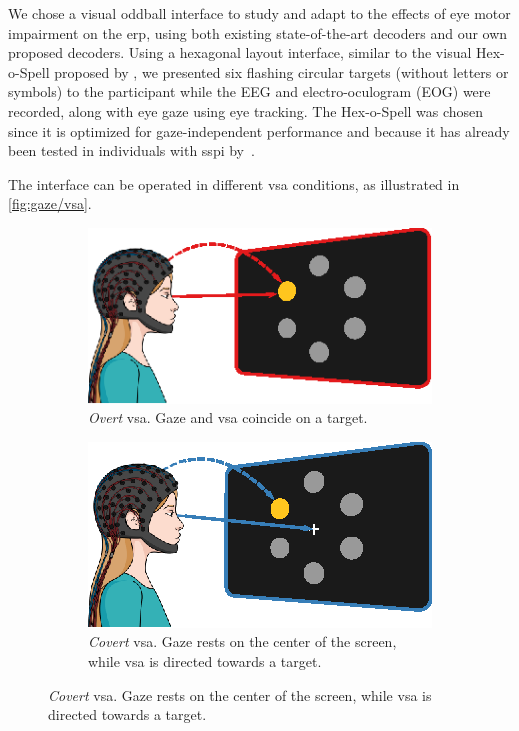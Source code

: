 We chose a visual oddball interface to study and adapt
to the effects of eye motor impairment on the \ac{erp}, using both existing state-of-the-art
decoders and our own proposed decoders.
Using a hexagonal layout interface, similar to the visual Hex-o-Spell proposed by
\textcite{Treder2010}, we presented six flashing circular targets
(without letters or symbols) to the participant while the EEG and
electro-oculogram (EOG) were recorded, along with eye gaze using eye tracking.
The Hex-o-Spell was chosen since it is optimized for gaze-independent
performance and because it has already been tested in individuals with
\ac{sspi} by~\textcite{Severens2014}.

The interface can be operated in different \ac{vsa} conditions, as illustrated in
\cref{fig:gaze/vsa}.

\begin{figure}
  \begin{subfigure}[t]{.45\textwidth}
    \includegraphics[width=\textwidth]{figures/gaze_independence/attention_overt.eps}
    \caption[Overt \ac{vsa}]{%
      \emph{Overt} \ac{vsa}.
      Gaze and \ac{vsa} coincide on a target.
    }
    \label{fig:gaze/vsa/overt}
  \end{subfigure}\hfill%
  \begin{subfigure}[t]{.45\textwidth}
    \includegraphics[width=\textwidth]{figures/gaze_independence/attention_covert.eps}
    \caption[Covert \ac{vsa}]{%
      \emph{Covert} \ac{vsa}.
      Gaze rests on the center of the screen, while \ac{vsa} is directed towards a target.
    }
    \label{fig:gaze/vsa/covert}
  \end{subfigure}


\end{figure}
